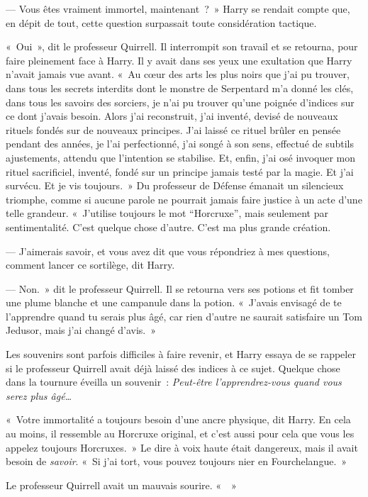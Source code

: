 --- Vous êtes vraiment immortel, maintenant~?~»
Harry se rendait compte que, en dépit de tout, cette question surpassait toute considération tactique.

«~Oui~», dit le professeur Quirrell.
Il interrompit son travail et se retourna, pour faire pleinement face à Harry.
Il y avait dans ses yeux une exultation que Harry n'avait jamais vue avant.
«~Au cœur des arts les plus noirs que j'ai pu trouver, dans tous les secrets interdits dont le monstre de Serpentard m'a donné les clés, dans tous les savoirs des sorciers, je n'ai pu trouver qu'une poignée d'indices sur ce dont j'avais besoin.
Alors j'ai reconstruit, j'ai inventé, devisé de nouveaux rituels fondés sur de nouveaux principes.
J'ai laissé ce rituel brûler en pensée pendant des années, je l'ai perfectionné, j'ai songé à son sens, effectué de subtils ajustements, attendu que l'intention se stabilise.
Et, enfin, j'ai osé invoquer mon rituel sacrificiel, inventé, fondé sur un principe jamais testé par la magie.
Et j'ai survécu.
Et je vis toujours.~»
Du professeur de Défense émanait un silencieux triomphe, comme si aucune parole ne pourrait jamais faire justice à un acte d'une telle grandeur.
«~J'utilise toujours le mot “Horcruxe”, mais seulement par sentimentalité.
C'est quelque chose d'autre.
C'est ma plus grande création.

--- J'aimerais savoir, et vous avez dit que vous répondriez à mes questions, comment lancer ce sortilège, dit Harry.

--- Non.~»
dit le professeur Quirrell.
Il se retourna vers ses potions et fit tomber une plume blanche et une campanule dans la potion.
«~J'avais envisagé de te l'apprendre quand tu serais plus âgé, car rien d'autre ne saurait satisfaire un Tom Jedusor, mais j'ai changé d'avis.~»

Les souvenirs sont parfois difficiles à faire revenir, et Harry essaya de se rappeler si le professeur Quirrell avait déjà laissé des indices à ce sujet.
Quelque chose dans la tournure éveilla un souvenir~: \emph{Peut-être l'apprendrez-vous quand vous serez plus âgé…}

«~Votre immortalité a toujours besoin d'une ancre physique, dit Harry.
En cela au moins, il ressemble au Horcruxe original, et c'est aussi pour cela que vous les appelez toujours Horcruxes.~»
Le dire à voix haute était dangereux, mais il avait besoin de \emph{savoir}.
«~Si j'ai tort, vous pouvez toujours nier en Fourchelangue.~»

Le professeur Quirrell avait un mauvais sourire.
«~~»

